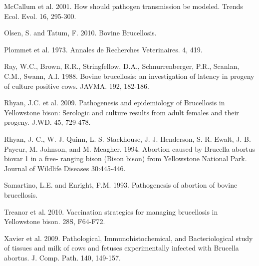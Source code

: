 \documentclass[letterpaper,12pt]{article}
\begin{document}
McCallum et al. 2001. How should pathogen transmission be modeled. Trends Ecol. Evol. 16, 295-300.

Olsen, S. and Tatum, F. 2010. Bovine Brucellosis.

Plommet et al. 1973. Annales de Recherches Veterinaires. 4, 419. %

Ray, W.C., Brown, R.R., Stringfellow, D.A., Schnurrenberger, P.R., Scanlan, C.M., Swann, A.I. 1988. Bovine brucellosis: an investigation of latency in progeny of culture positive cows. JAVMA. 192, 182-186.

Rhyan, J.C. et al. 2009. Pathogenesis and epidemiology of Brucellosis in Yellowstone bison: Serologic and culture results from adult females and their progeny. J.WD. 45, 729-478.

Rhyan, J. C., W. J. Quinn, L. S. Stackhouse, J. J. Henderson, S. R. Ewalt, J. B. Payeur, M. Johnson, and M. Meagher. 1994. Abortion caused by Brucella abortus biovar 1 in a free- ranging bison (Bison bison) from Yellowstone National Park. Journal of Wildlife Diseases 30:445-446.

Samartino, L.E. and Enright, F.M. 1993. Pathogenesis of abortion of bovine brucellosis. 

Treanor et al. 2010. Vaccination strategies for managing brucellosis in Yellowstone bison. 28S, F64-F72.

Xavier et al. 2009. Pathological, Immunohistochemical, and Bacteriological study of tissues and milk of cows and fetuses experimentally infected with Brucella abortus. J. Comp. Path. 140, 149-157. 
\end{document}
